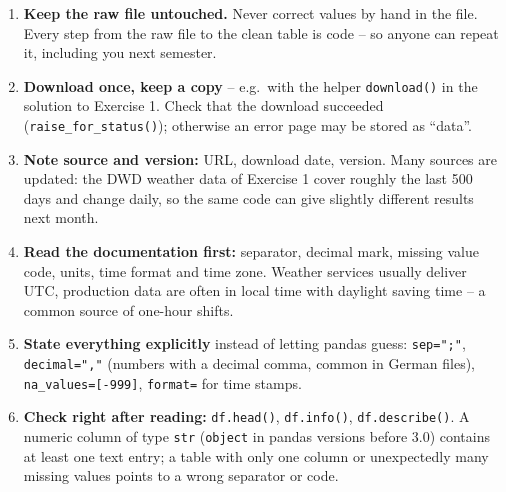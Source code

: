 \documentclass[
  letterpaper,
  DIV=11,
  numbers=noendperiod]{scrreprt}
\providecommand{\tightlist}{%
  \setlength{\itemsep}{0pt}\setlength{\parskip}{0pt}}\usepackage{longtable,booktabs,array}
\begin{document}
\begin{tcolorbox}[enhanced jigsaw, left=2mm, title=\textcolor{quarto-callout-tip-color}{\faLightbulb}\hspace{0.5em}{Good practice: downloading and reading raw files}, opacityback=0, breakable, rightrule=.15mm, arc=.35mm, toptitle=1mm, colbacktitle=quarto-callout-tip-color!10!white, opacitybacktitle=0.6, coltitle=black, colframe=quarto-callout-tip-color-frame, bottomrule=.15mm, leftrule=.75mm, bottomtitle=1mm, titlerule=0mm, toprule=.15mm, colback=white]

\begin{enumerate}
\def\labelenumi{\arabic{enumi}.}
\tightlist
\item
  \textbf{Keep the raw file untouched.} Never correct values by hand in
  the file. Every step from the raw file to the clean table is code --
  so anyone can repeat it, including you next semester.
\item
  \textbf{Download once, keep a copy} -- e.g.~with the helper
  \texttt{download()} in the solution to Exercise 1. Check that the
  download succeeded (\texttt{raise\_for\_status()}); otherwise an error
  page may be stored as ``data''.
\item
  \textbf{Note source and version:} URL, download date, version. Many
  sources are updated: the DWD weather data of Exercise 1 cover roughly
  the last 500 days and change daily, so the same code can give slightly
  different results next month.
\item
  \textbf{Read the documentation first:} separator, decimal mark,
  missing value code, units, time format and time zone. Weather services
  usually deliver UTC, production data are often in local time with
  daylight saving time -- a common source of one-hour shifts.
\item
  \textbf{State everything explicitly} instead of letting pandas guess:
  \texttt{sep=";"}, \texttt{decimal=","} (numbers with a decimal comma,
  common in German files), \texttt{na\_values={[}-999{]}},
  \texttt{format=} for time stamps.
\item
  \textbf{Check right after reading:} \texttt{df.head()},
  \texttt{df.info()}, \texttt{df.describe()}. A numeric column of type
  \texttt{str} (\texttt{object} in pandas versions before 3.0) contains
  at least one text entry; a table with only one column or unexpectedly
  many missing values points to a wrong separator or code.
\end{enumerate}

\end{tcolorbox}
\end{document}
